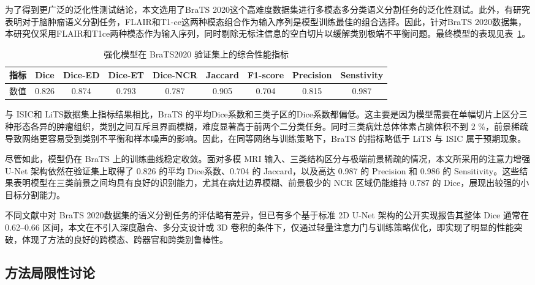 为了得到更广泛的泛化性测试结论，本文选用了BraTS 2020这个高难度数据集进行多模态多分类语义分割任务的泛化性测试。此外，有研究表明对于脑肿瘤语义分割任务，FLAIR和T1-ce这两种模态组合作为输入序列是模型训练最佳的组合选择\cite{buchner2023}。因此，针对BraTS 2020数据集，本研究仅采用FLAIR和T1ce两种模态作为输入序列，同时剔除无标注信息的空白切片以缓解类别极端不平衡问题。最终模型的表现见表~\ref{tab:brain_final_metrics}。

\begin{table}[!h]
    \centering
    \caption{强化模型在 BraTS2020 验证集上的综合性能指标}
    \label{tab:brain_final_metrics}
    \begin{tabular}{lcccccccc}
        \toprule
        指标 & Dice & Dice-ED & Dice-ET & Dice-NCR & Jaccard & F1-score & Precision & Senstivity\\
        \midrule
        数值 & 0.826 & 0.874 & 0.793 & 0.787 & 0.905 & 0.704 & 0.815 & 0.987 \\
        \bottomrule
    \end{tabular}
\end{table}

与 ISIC和 LiTS数据集上指标结果相比，BraTS 的平均Dice系数和三类子区的Dice系数都偏低。这主要是因为模型需要在单幅切片上区分三种形态各异的肿瘤组织，类别之间互斥且界面模糊，难度显著高于前两个二分类任务。同时三类病灶总体体素占脑体积不到 2 \%，前景稀疏导致网络更容易受到类别不平衡和样本噪声的影响。因此，在同等网络与训练策略下，BraTS 的指标略低于 LiTS 与 ISIC 属于预期现象。

尽管如此，模型仍在 BraTS 上的训练曲线稳定收敛。面对多模 MRI 输入、三类结构区分与极端前景稀疏的情况，本文所采用的注意力增强 U-Net 架构依然在验证集上取得了 0.826 的平均 Dice系数、0.704 的 Jaccard，以及高达 0.987 的 Precision 和 0.986 的 Sensitivity。这些结果表明模型在三类前景之间均具有良好的识别能力，尤其在病灶边界模糊、前景极少的 NCR 区域仍能维持 0.787 的 Dice，展现出较强的小目标分割能力。


不同文献中对 BraTS 2020数据集的语义分割任务的评估略有差异\cite{islam2020,wang2021,menze2015}，但已有多个基于标准 2D U-Net 架构的公开实现报告其整体 Dice 通常在 0.62–0.66 区间，本文在不引入深度融合、多分支设计或 3D 卷积的条件下，仅通过轻量注意力门与训练策略优化，即实现了明显的性能突破，体现了方法的良好的跨模态、跨器官和跨类别鲁棒性。

\subsection{方法局限性讨论}

